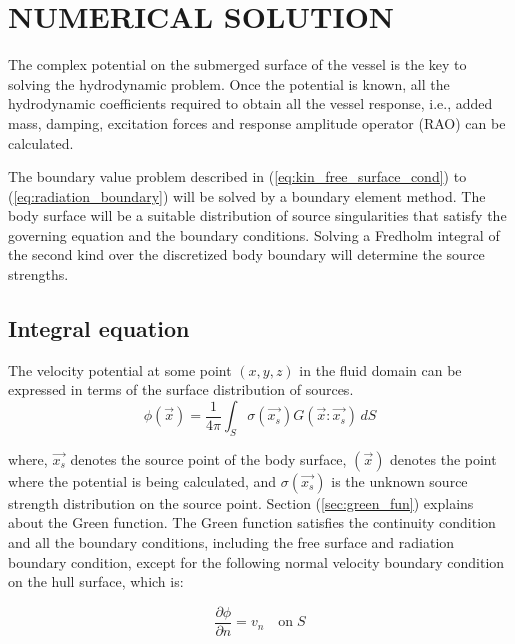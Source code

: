 \chapter{NUMERICAL SOLUTION}
The complex potential on the submerged surface of the vessel is the key to solving the hydrodynamic problem. 
Once the potential is known, all the hydrodynamic coefficients required 
to obtain all the vessel response, i.e., added mass, damping, excitation forces and 
response amplitude operator (RAO) can be calculated.

The boundary value problem described in (\ref{eq:kin_free_surface_cond}) to 
(\ref{eq:radiation_boundary})  will be solved by a boundary element method. 
The body surface will be a suitable distribution of source singularities that satisfy 
the governing equation and the boundary conditions. Solving a Fredholm integral of the 
second kind over the discretized body boundary will determine the source strengths. 

\section{Integral equation}
The velocity potential at some point $(x, y, z)$ in the fluid domain can be expressed in 
terms of the surface distribution of sources.
\begin{equation}
    \label{eq:vel_pot}
    \phi(\vec{x}) = \frac{1}{4\pi}\int_S \sigma(\vec{x_s})G(\vec{x}:\vec{x_s})\,dS
\end{equation}

where, $\vec{x_s}$ denotes the source point of the body surface, $(\vec{x})$ denotes the 
point where the potential is being calculated, and $\sigma(\vec{x_s})$ is the unknown 
source strength distribution on the source point. Section (\ref{sec:green_fun})
explains about the Green function. 
The Green function satisfies the continuity condition and all the boundary conditions, 
including the free surface and radiation boundary condition, except for the following 
normal velocity boundary condition on the hull surface, which is:

\begin{equation}
    \label{eq:vel_boundary_cond}
    \frac{\partial \phi}{\partial n} = v_n \quad \text{on}\; S
\end{equation}

